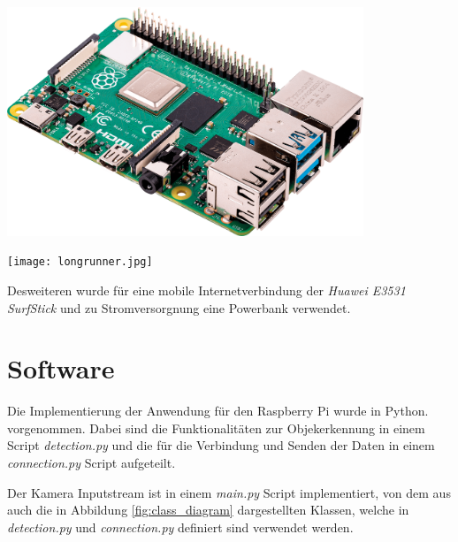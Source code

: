 

\begin{minipage}{0.55\textwidth}
    \centering
    \includegraphics[width=0.8\textwidth]{./Bilder/raspberrypi_4.png}
    \label{img:raspberrypi}
\end{minipage}
\begin{minipage}{0.45\textwidth}
    \centering
    \texttt{[image: longrunner.jpg]}
    \label{fig:rpicam}
\end{minipage}
\vspace{1cm}


Desweiteren wurde für eine mobile Internetverbindung 
der \textit{Huawei E3531 SurfStick} und zu Stromversorgnung
eine Powerbank verwendet.





\section{Software}


Die Implementierung der Anwendung für den Raspberry Pi wurde in Python.
vorgenommen. 
Dabei sind die Funktionalitäten zur Objekerkennung in einem Script 
\textit{detection.py} 
und die für die Verbindung und Senden der Daten in einem 
\textit{connection.py} Script aufgeteilt.

Der Kamera Inputstream ist in einem \textit{main.py} Script implementiert, 
von dem aus auch die in Abbildung \ref{fig:class_diagram} 
dargestellten Klassen, welche in \textit{detection.py}
und \textit{connection.py} definiert sind verwendet werden.


